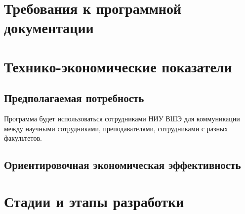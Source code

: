 \documentclass[a4paper,12pt,reqno]{article}
\begin{document}
						\newpage
	\section{Требования к программной документации}
	
	
						\newpage
	\section{Технико-экономические показатели}
	\subsection{Предполагаемая потребность}
	Программа будет использоваться сотрудниками НИУ ВШЭ для коммуникации между научными сотрудниками, преподавателями, сотрудниками с разных факультетов. 
	
	
	\subsection{Ориентировочная экономическая эффективность} \label{competitors}
	
	
						\newpage
	\section{Стадии и этапы разработки}
	
\end{document}
